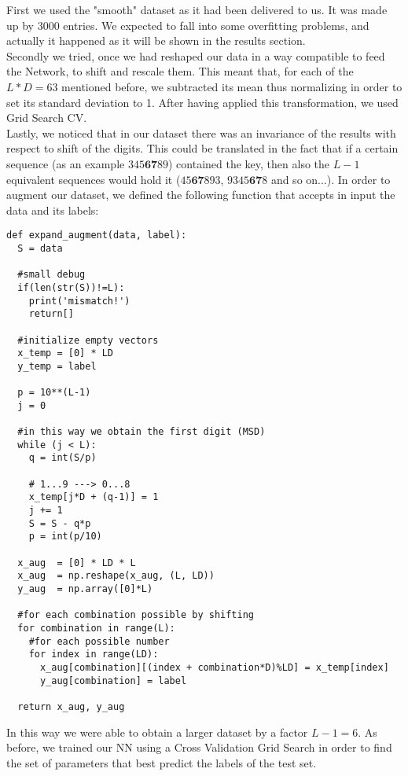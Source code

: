 \documentclass[prl,twocolumn]{revtex4-1}
\begin{document}
First we used the "smooth" dataset as it had been delivered to us. It was made up by 3000 entries. We expected to fall into some overfitting problems, and actually it happened as it will be shown in the results section.\\
Secondly we tried, once we had reshaped our data in a way compatible to feed the Network, to shift and rescale them. This meant that, for each of the $L*D = 63$ mentioned before, we subtracted its mean thus normalizing in order to set its standard deviation to 1. After having applied this transformation, we used Grid Search CV.\\
Lastly, we noticed that in our dataset there was an invariance of the results with respect to shift of the digits. This could be translated in the fact that if a certain sequence (as an example $345\textbf{67}89$) contained the key, then also the $L-1$ equivalent sequences would hold it ($45\textbf{67}893$, $9345\textbf{67}8$ and so on...). In order to augment our dataset, we defined the following function that accepts in input the data and its labels:

\begin{verbatim}
def expand_augment(data, label):
  S = data

  #small debug 
  if(len(str(S))!=L):
    print('mismatch!')
    return[]
    
  #initialize empty vectors
  x_temp = [0] * LD
  y_temp = label

  p = 10**(L-1)
  j = 0

  #in this way we obtain the first digit (MSD)
  while (j < L):
    q = int(S/p)

    # 1...9 ---> 0...8
    x_temp[j*D + (q-1)] = 1
    j += 1
    S = S - q*p
    p = int(p/10)

  x_aug  = [0] * LD * L
  x_aug  = np.reshape(x_aug, (L, LD))
  y_aug  = np.array([0]*L)

  #for each combination possible by shifting
  for combination in range(L):
    #for each possible number 
    for index in range(LD):
      x_aug[combination][(index + combination*D)%LD] = x_temp[index]
      y_aug[combination] = label 

  return x_aug, y_aug

\end{verbatim}

In this way we were able to obtain a larger dataset by a factor $L-1 = 6$. As before, we trained our NN using a Cross Validation Grid Search in order to find the set of parameters that best predict the labels of the test set.
\end{document}
